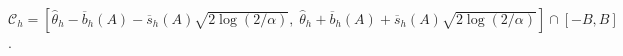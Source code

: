 \(\mathcal C_h=[\widehat\theta_h-\overline b_h(A)-\overline s_h(A)\sqrt{2\log(2/\alpha)},\;\widehat\theta_h+\overline b_h(A)+\overline s_h(A)\sqrt{2\log(2/\alpha)}]\cap[-B,B]\).